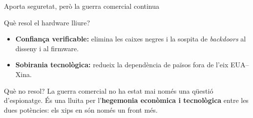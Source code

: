 \documentclass[catalan]{beamer}
\begin{document}

\begin{frame}{Aporta seguretat, però la guerra comercial continua}
  \begin{exampleblock}{Què resol el hardware lliure?}
    \begin{itemize}
      \item \textbf{Confiança verificable:} elimina les caixes negres i la sospita de \textit{backdoors} al disseny i al firmware.
      \item \textbf{Sobirania tecnològica:} redueix la dependència de països fora de l'eix EUA--Xina.
    \end{itemize}
  \end{exampleblock}

  \pause
  \vspace{0.3cm}
  \begin{alertblock}{Què no resol?}
    La guerra comercial no ha estat mai només una qüestió d'espionatge. És una lluita per l'\textbf{hegemonia econòmica i tecnològica} entre les dues potències: els xips en són només un front més.
  \end{alertblock}
\end{frame}

\frame{
  \titlepage
}
\end{document}
